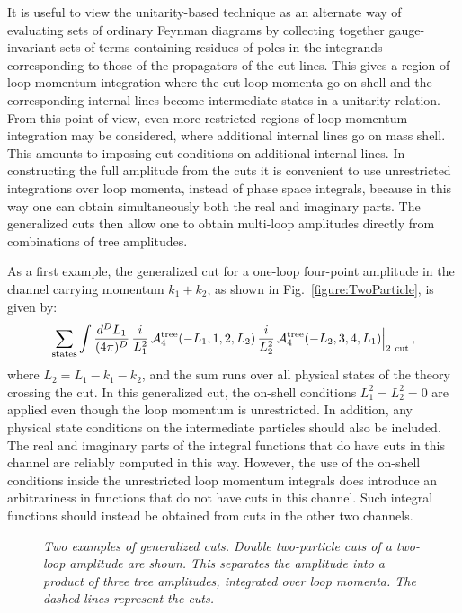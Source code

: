 \documentclass[12pt]{livrev}
\begin{document}
It is useful to view the unitarity-based technique as an alternate way
of evaluating sets of ordinary Feynman diagrams by collecting together
gauge-invariant sets of terms containing residues of poles in the
integrands corresponding to those of the propagators of the cut
lines. This gives a region of loop-momentum integration where the cut
loop momenta go on shell and the corresponding internal lines become
intermediate states in a unitarity relation.  From this point of view,
even more restricted regions of loop momentum integration may be
considered, where additional internal lines go on mass shell.  This
amounts to imposing cut conditions on additional internal lines.  In
constructing the full amplitude from the cuts it is convenient to use
unrestricted integrations over loop momenta, instead of phase space
integrals, because in this way one can obtain simultaneously both the
real and imaginary parts. The generalized cuts then allow one to
obtain multi-loop amplitudes directly from combinations of tree
amplitudes.


As a first example, the generalized cut for a one-loop four-point
amplitude in the channel carrying momentum $k_1 + k_2$, as shown in
Fig.~\ref{figure:TwoParticle}, is given by: 
%
\begin{equation}
 \sum_{\rm states} \int {d^D L_1 \over (4 \pi)^D} \, 
  {i\over L_1^2} \,
{\cal A}_{4}^{\rm tree}(-L_1,1,2,L_2) \,{i \over L_2^2}\,
{\cal A}_{4}^{\rm tree} (-L_2,3,4,L_1) \Bigr|_{\rm2\ cut} \,, 
\label{BasicCutEquation}
\end{equation}
%
where $L_2 = L_1 - k_1 - k_2$, and the sum runs over all physical
states of the theory crossing the cut.  In this generalized cut, the
on-shell conditions $L_1^2 = L_2^2 = 0$ are applied even though the
loop momentum is unrestricted.  In addition, any physical state
conditions on the intermediate particles should also be included.  The
real and imaginary parts of the integral functions that do have cuts
in this channel are reliably computed in this way. However, the use of the
on-shell conditions inside the unrestricted loop momentum integrals does
introduce an arbitrariness in functions that do not have cuts in this
channel. Such integral functions should instead be obtained from cuts
in the other two channels.


\begin{figure}[h]
  \def\epsfsize#1#2{0.9#1} \centerline{}
  \caption{\it Two examples of generalized cuts. Double two-particle
  cuts of a two-loop amplitude are shown. This separates the amplitude into a
  product of three tree amplitudes, integrated over loop momenta.  The
  dashed lines represent the cuts. }
\label{figure:DoubleDoubleAmpl}
\end{figure}
\end{document}
